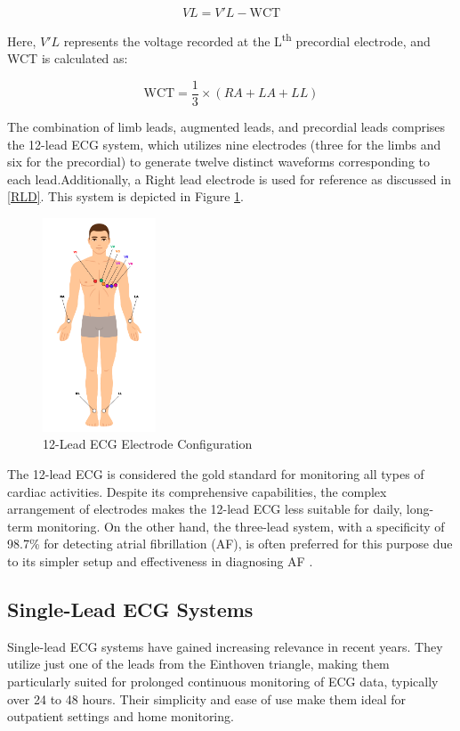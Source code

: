 \begin{equation}
	VL = V'L - \text{WCT}
\end{equation}

Here, \( V'L \) represents the voltage recorded at the L\textsuperscript{th} precordial electrode, and WCT is calculated as:

\begin{equation}
	\text{WCT} = \frac{1}{3} \times (RA + LA + LL)
\end{equation}

\noindent The combination of limb leads, augmented leads, and precordial leads comprises the 12-lead ECG system, which utilizes nine electrodes (three for the limbs and six for the precordial) to generate twelve distinct waveforms corresponding to each lead.Additionally, a Right lead electrode is used for reference as discussed in \ref{RLD}. This system is depicted in Figure \ref{fig:12_lead_ecg}.
\begin{figure}[H]
	\centering
	\includegraphics[width=0.3\textwidth]{images/12lead placement}
	\caption{12-Lead ECG Electrode Configuration \cite{cardiacdirect_ecg}}
	\label{fig:12_lead_ecg}
\end{figure}

\noindent The 12-lead ECG is considered the gold standard for monitoring all types of cardiac activities. Despite its comprehensive capabilities, the complex arrangement of electrodes makes the 12-lead ECG less suitable for daily, long-term monitoring. On the other hand, the three-lead system, with a specificity of 98.7\% for detecting atrial fibrillation (AF), is often preferred for this purpose due to its simpler setup and effectiveness in diagnosing AF \cite{kristensen2016}.

\subsection{Single-Lead ECG Systems}
\vspace{1em}
\noindent Single-lead ECG systems have gained increasing relevance in recent years. They utilize just one of the leads from the Einthoven triangle, making them particularly suited for prolonged continuous monitoring of ECG data, typically over 24 to 48 hours. Their simplicity and ease of use make them ideal for outpatient settings and home monitoring.\\

